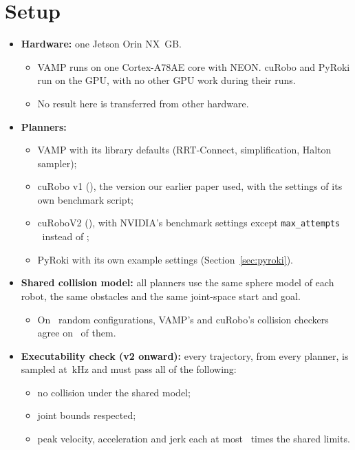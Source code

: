 \documentclass[11pt]{article}
\begin{document}
\section{Setup}
\begin{itemize}
  \item \textbf{Hardware:} one Jetson Orin NX \boardMem\,GB.
  \begin{itemize}
    \item VAMP runs on one Cortex-A78AE core with NEON. cuRobo and PyRoki run on the GPU, with no other GPU work during their runs.
    \item No result here is transferred from other hardware.
  \end{itemize}
  \item \textbf{Planners:}
  \begin{itemize}
    \item VAMP \texttt{\vampCommit} with its library defaults (RRT-Connect, simplification, Halton sampler);
    \item cuRobo v1 \texttt{\curoboOneCommit} (\curoboOneVersion), the version our earlier paper used, with the settings of its own benchmark script;
    \item cuRoboV2 \texttt{\curoboTwoCommit} (\curoboTwoVersion), with NVIDIA's benchmark settings except \texttt{max\_attempts} \vOneAttempts\ instead of \nvidiaAttempts;
    \item PyRoki with its own example settings (Section~\ref{sec:pyroki}).
  \end{itemize}
  \item \textbf{Shared collision model:} all planners use the same sphere model of each robot, the same obstacles and the same joint-space start and goal.
  \begin{itemize}
    \item On \agreeN\ random configurations, VAMP's and cuRobo's collision checkers agree on \agreeShare\ of them.
  \end{itemize}
  \item \textbf{Executability check (v2 onward):} every trajectory, from every planner, is sampled at \gateHz\,kHz and must pass all of the following:
  \begin{itemize}
    \item no collision under the shared model;
    \item joint bounds respected;
    \item peak velocity, acceleration and jerk each at most \gateTol\ times the shared limits.
  \end{itemize}

\end{itemize}
\end{document}
